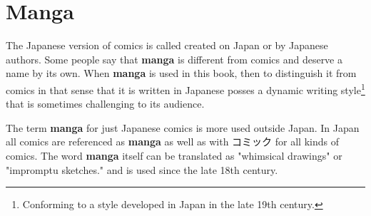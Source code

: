 \section{Manga}
\label{sec:Manga}

The Japanese version of comics is called 
created on Japan or by Japanese authors. Some people say that \textbf{manga} is
different from comics and deserve a name by its own. When \textbf{manga} is
used in this book, then to distinguish it from comics in that sense that it is
written in Japanese posses a dynamic writing style\footnote{Conforming to a
style developed in Japan in the late 19th century.}  that is sometimes
challenging to its audience.

The term \textbf{manga} for just Japanese comics is more used outside Japan. In
Japan all comics are referenced as \textbf{manga} as well as with {コミック}
 for all kinds of comics. The word \textbf{manga} itself can be
translated as "whimsical drawings" or "impromptu sketches." and is used since
the late 18th century.


